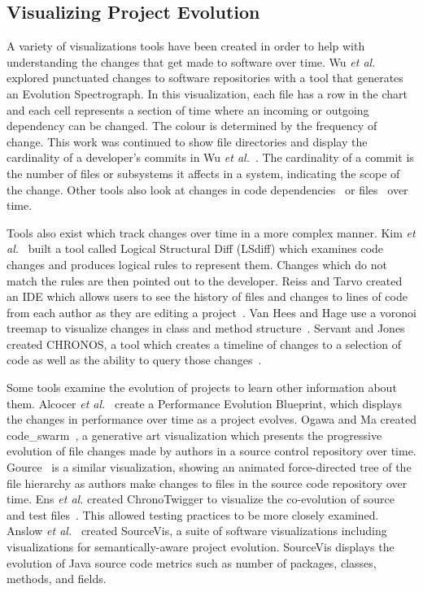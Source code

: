 \subsection{Visualizing Project Evolution}

A variety of visualizations tools have been created in order to help with understanding the changes that get made to software over time. Wu \textit{et al.}~\cite{wu2004a} explored punctuated changes to software repositories with a tool that generates an Evolution Spectrograph. In this visualization, each file has a row in the chart and each cell represents a section of time where an incoming or outgoing dependency can be changed. The colour is determined by the frequency of change. This work was continued to show file directories and display the cardinality of a developer's commits in Wu \textit{et al.}~\cite{wu2004}. The cardinality of a commit is the number of files or subsystems it affects in a system, indicating the scope of the change. Other tools also look at changes in code dependencies~\cite{6980224} or files~\cite{6650525, 7332421, voinea2006} over time.

Tools also exist which track changes over time in a more complex manner. Kim \textit{et al.}~\cite{Kim:2009:DRS:1555001.1555046} built a tool called Logical Structural Diff (LSdiff) which examines code changes and produces logical rules to represent them. Changes which do not match the rules are then pointed out to the developer. Reiss and Tarvo created an IDE which allows users to see the history of files and changes to lines of code from each author as they are editing a project~\cite{6650521}. Van Hees and Hage use a voronoi treemap to visualize changes in class and method structure~\cite{7332410}. Servant and Jones created CHRONOS, a tool which creates a timeline of changes to a selection of code as well as the ability to query those changes~\cite{6650547}.

Some tools examine the evolution of projects to learn other information about them. Alcocer \textit{et al.}~\cite{6650523} create a Performance Evolution Blueprint, which displays the changes in performance over time as a project evolves. Ogawa and Ma created code\_swarm~\cite{codeswarm}, a generative art visualization which presents the progressive evolution of file changes made by authors in a source control repository over time. Gource~\cite{gource} is a similar visualization, showing an animated force-directed tree of the file hierarchy as authors make changes to files in the source code repository over time. Ens \textit{et al.} created ChronoTwigger to visualize the co-evolution of source and test files~\cite{6980223}. This allowed testing practices to be more closely examined. Anslow \textit{et al.}~\cite{sourcevis} created SourceVis, a suite of software visualizations including visualizations for semantically-aware project evolution. SourceVis displays the evolution of Java source code metrics such as number of packages, classes, methods, and fields.

